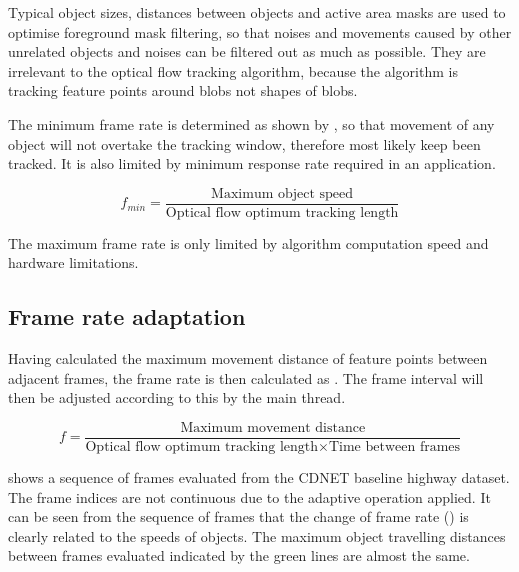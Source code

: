 Typical object sizes, distances between objects and active area masks are used to optimise foreground mask filtering, so that noises and movements caused by other unrelated objects and noises can be filtered out as much as possible. They are irrelevant to the optical flow tracking algorithm, because the algorithm is tracking feature points around blobs not shapes of blobs.

The minimum frame rate is determined as shown by , so that movement of any object will not overtake the tracking window, therefore most likely keep been tracked. It is also limited by minimum response rate required in an application.

\begin{equation}
	f_{min} = \frac{\text{Maximum object speed}}{\text{Optical flow optimum tracking length}}
	\label{f_min}
\end{equation}

The maximum frame rate is only limited by algorithm computation speed and hardware limitations.

\subsection{Frame rate adaptation}

Having calculated the maximum movement distance of feature points between adjacent frames, the frame rate is then calculated as . The frame interval will then be adjusted according to this by the main thread.

\begin{equation}
	f = \frac{\text{Maximum movement distance}}{\text{Optical flow optimum tracking length} \times \text{Time between frames}}
	\label{f_rate}
\end{equation}


 shows a sequence of frames evaluated from the CDNET baseline highway dataset. The frame indices are not continuous due to the adaptive operation applied. It can be seen from the sequence of frames that the change of frame rate () is clearly related to the speeds of objects. The maximum object travelling distances between frames evaluated indicated by the green lines are almost the same.

